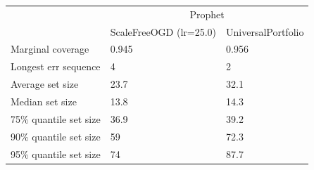 \begin{tabular}{lll}
\toprule
& \multicolumn{2}{c}{Prophet} \\
& ScaleFreeOGD (lr=25.0) & UniversalPortfolio \\
\midrule
Marginal coverage & 0.945 & 0.956 \\
Longest err sequence & 4 & 2 \\
Average set size & 23.7 & 32.1 \\
Median set size & 13.8 & 14.3 \\
75\% quantile set size & 36.9 & 39.2 \\
90\% quantile set size & 59 & 72.3 \\
95\% quantile set size & 74 & 87.7 \\
\bottomrule
\end{tabular}
